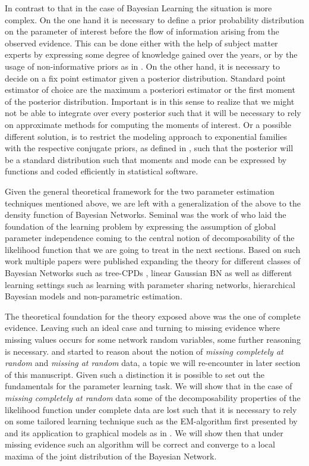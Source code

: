 \documentclass[11pt]{article}
\begin{document}
\begin{article}
In contrast to that in the case of Bayesian Learning the situation
is more complex. On the one hand it is necessary to define a prior
probability distribution on the parameter of interest before the
flow of information arising from the observed evidence. This can be
done either with the help of subject matter experts by expressing
some degree of knowledge gained over the years, or by the usage of
non-informative priors as in \cite{syversveen1998noninformative}. On
the other hand, it is necessary to decide on a fix point estimator
given a posterior distribution. Standard point estimator of choice
are the maximum a posteriori estimator or the first moment of the
posterior distribution. Important is in this sense to realize that
we might not be able to integrate over every posterior such that it
will be necessary to rely on approximate methods for computing the
moments of interest. Or a possible different solution, is to
restrict the modeling approach to exponential families with the
respective conjugate priors, as defined in
\cite{schlaifer1961applied}, such that the posterior will be a
standard distribution such that moments and mode can be expressed
by functions and coded efficiently in statistical software.

Given the general theoretical framework for the two parameter
estimation techniques mentioned above, we are left with a
generalization of the above to the density function of Bayesian
Networks. Seminal was the work of \cite{spiegelhalter1990sequential}
who laid the foundation of the learning problem by expressing the
assumption of global parameter independence coming to the central
notion of decomposability of the likelihood function that we are
going to treat in the next sections. Based on such work multiple
papers were published expanding the theory for different classes of
Bayesian Networks such as tree-CPDs \cite{buntine1993tree}, linear
Gaussian BN \cite{heckerman1995learning} as well as different
learning settings such as learning with parameter sharing networks,
hierarchical Bayesian models and non-parametric estimation.

The theoretical foundation for the theory exposed above was the one
of complete evidence. Leaving such an ideal case and turning to
missing evidence where missing values occurs for some network
random variables, some further reasoning is
necessary. \cite{rubin1976inference} and \cite{little1976inference}
started to reason about the notion of \emph{missing completely at
random} and \emph{missing at random} data, a topic we will re-encounter
in later section of this manuscript. Given such a distinction it is
possible to set out the fundamentals for the parameter learning
task. We will show that in the case of \emph{missing completely at
random} data some of the decomposability properties of the
likelihood function under complete data are lost such that it is
necessary to rely on some tailored learning technique such as the
EM-algorithm first presented by \cite{dempster1977maximum} and its
application to graphical models as in \cite{lauritzen1995algorithm}.
We will show then that under missing evidence such an algorithm
will be correct and converge to a local maxima of the joint
distribution of the Bayesian Network.  


\end{article}
\end{document}
